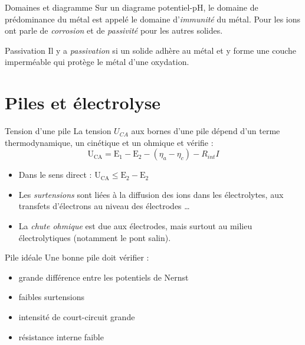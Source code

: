 \documentclass[french, a4paper, 11pt, twocolumn]{article}
\begin{document}
    \begin{cadre}{Domaines et diagramme}
        Sur un diagrame potentiel-pH, le domaine de prédominance du métal est appelé le domaine d'\emph{immunité} du métal.
        Pour les ions ont parle de \emph{corrosion} et de \emph{passivité} pour les autres solides.
    \end{cadre}

    \begin{cadre}{Passivation}
        Il y a \emph{passivation} si un solide adhère au métal et y forme une couche imperméable qui protège le métal d'une oxydation. 
    \end{cadre}

    \section{Piles et électrolyse}

    \begin{cadre}{Tension d'une pile}
        La tension \(U_{CA}\) aux bornes d'une pile dépend d'un terme
        thermodynamique, un cinétique et un ohmique et vérifie : 
            \[\mathrm{U_{CA}=E_1-E_2}-(\eta_a-\eta_c)-R_{int}I\]
        
        \tcblower
        \begin{itemize}
            \item Dans le sens direct : \(\mathrm{U_{CA}\leq E_2-E_2}\)
            \item Les \emph{surtensions} sont liées à la diffusion des ions dans les électrolytes,
                aux transfets d'électrons au niveau des électrodes \dots
            \item La \emph{chute ohmique} est due aux électrodes, mais surtout au milieu électrolytiques (notamment le pont salin).
        \end{itemize}
    \end{cadre}

    \begin{cadre}{Pile idéale}
        Une bonne pile doit vérifier :
        \begin{itemize}[label=\(\bullet\)]
            \item grande différence entre les potentiels de Nernst
            \item faibles surtensions
            \item intensité de court-circuit grande
            \item résistance interne faible
        \end{itemize}
    \end{cadre}
\end{document}
